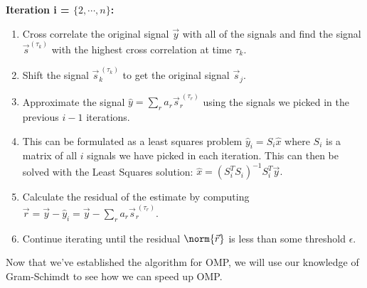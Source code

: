 \textbf{Iteration i = $\{2, \cdots, n\}$:}
\begin{enumerate}[label=(\arabic*)]
  \item Cross correlate the original signal $\vec{y}$ with all of the signals and find the signal $\vec{s}_{}^({\tau_{k}})$ with the highest cross correlation at time $\tau_{k}.$
  \item Shift the signal $\vec{s}_{k}^{\ (\tau_{k})}$ to get the original signal $\vec{s}_{j}.$
  \item Approximate the signal $\hat{y} = \sum\limits_{r} a_{r} \vec{s}_{r}^{\ (\tau_{r})}$ using the signals we picked in the previous $i - 1$ iterations. 
  \item This can be formulated as a least squares problem $\hat{y}_{i} = S_{i} \hat{x}$ where $S_{i}$ is a matrix of all $i$ signals we have picked in each iteration. This can then be solved with the Least Squares solution: $\hat{x} = (S_{i}^{T} S_{i})^{-1} S_{i}^{T} \vec{y}
  .$
  \item Calculate the residual of the estimate by computing $\vec{r} = \vec{y} - \hat{y}_{i} = \vec{y} - \sum\limits_{r} a_{r} \vec{s}_{r}^{\ (\tau_{r})}.$
  \item Continue iterating until the residual $\norm{\vec{r}}$ is less than some threshold $\epsilon.$
\end{enumerate}

Now that we've established the algorithm for OMP, we will use our knowledge of Gram-Schimdt to see how we can speed up OMP.

